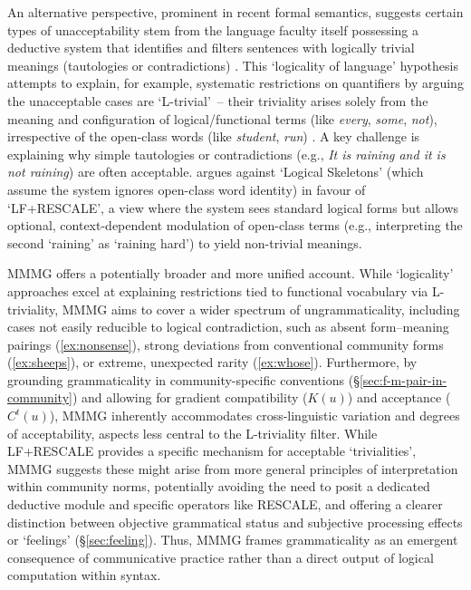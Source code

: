 \documentclass[12pt,letterpaper]{article}
\begin{document}
An alternative perspective, prominent in recent formal semantics, suggests certain types of unacceptability stem from the language faculty itself possessing a deductive system that identifies and filters sentences with logically trivial meanings (tautologies or contradictions) \autocite[cf.][]{del_pinal_logicality_2019, chierchia_logic_2013, fox_economy_2000}. This `logicality of language' hypothesis attempts to explain, for example, systematic restrictions on quantifiers by arguing the unacceptable cases are `L-trivial'~-- their triviality arises solely from the meaning and configuration of logical/functional terms (like \textit{every}, \textit{some}, \textit{not}), irrespective of the open-class words (like \textit{student}, \textit{run}) \autocite{gajewski_l-triviality_2009}. A key challenge is explaining why simple tautologies or contradictions (e.g., \textit{It is raining and it is not raining}) are often acceptable. \textcite{del_pinal_logicality_2019} argues against `Logical Skeletons' (which assume the system ignores open-class word identity) in favour of `LF+RESCALE', a view where the system sees standard logical forms but allows optional, context-dependent modulation of open-class terms (e.g., interpreting the second `raining' as `raining hard') to yield non-trivial meanings.

MMMG offers a potentially broader and more unified account. While `logicality' approaches excel at explaining restrictions tied to functional vocabulary via L-triviality, MMMG aims to cover a wider spectrum of ungrammaticality, including cases not easily reducible to logical contradiction, such as absent form--meaning pairings (\ref{ex:nonsense}), strong deviations from conventional community forms (\ref{ex:sheeps}), or extreme, unexpected rarity (\ref{ex:whose}). Furthermore, by grounding grammaticality in community-specific conventions (\S\ref{sec:f-m-pair-in-community}) and allowing for gradient compatibility ($K(u)$) and acceptance ($C^t(u)$), MMMG inherently accommodates cross-linguistic variation and degrees of acceptability, aspects less central to the L-triviality filter. While LF+RESCALE provides a specific mechanism for acceptable `trivialities', MMMG suggests these might arise from more general principles of interpretation within community norms, potentially avoiding the need to posit a dedicated deductive module and specific operators like RESCALE, and offering a clearer distinction between objective grammatical status and subjective processing effects or `feelings' (\S\ref{sec:feeling}). Thus, MMMG frames grammaticality as an emergent consequence of communicative practice rather than a direct output of logical computation within syntax.
\end{document}
